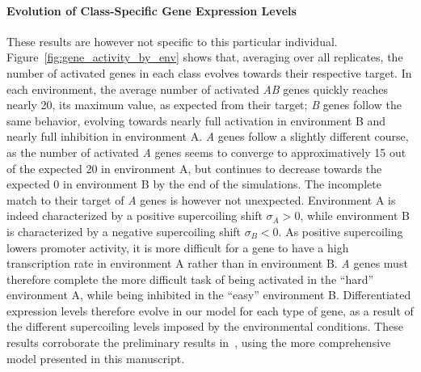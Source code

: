 \paragraph{Evolution of Class-Specific Gene Expression Levels}
These results are however not specific to this particular individual.
Figure~\ref{fig:gene_activity_by_env} shows that, averaging over all replicates, the number of activated genes in each class evolves towards their respective target.
In each environment, the average number of activated \emph{AB} genes quickly reaches nearly 20, its maximum value, as expected from their target; \emph{B} genes follow the same behavior, evolving towards nearly full activation in environment B and nearly full inhibition in environment A.
\emph{A} genes follow a slightly different course, as the number of activated \emph{A} genes seems to converge to approximatively 15 out of the expected 20 in environment A, but continues to decrease towards the expected 0 in environment B by the end of the simulations.
The incomplete match to their target of \emph{A} genes is however not unexpected.
Environment A is indeed characterized by a positive supercoiling shift $\sigma_A > 0$, while environment B is characterized by a negative supercoiling shift $\sigma_B < 0$.
As positive supercoiling lowers promoter activity, it is more difficult for a gene to have a high transcription rate in environment A rather than in environment B.
\emph{A} genes must therefore complete the more difficult task of being activated in the ``hard'' environment A, while being inhibited in the ``easy'' environment B.
Differentiated expression levels therefore evolve in our model for each type of gene, as a result of the different supercoiling levels imposed by the environmental conditions.
These results corroborate the preliminary results in~\citep{grohens2021}, using the more comprehensive model presented in this manuscript.

